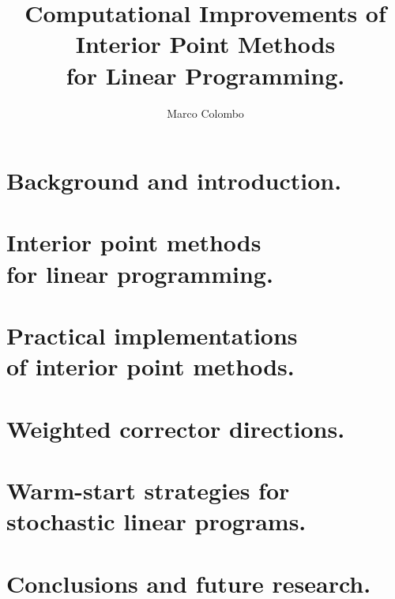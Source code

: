 \documentclass[phd,draft,leftchapter]{msthesis}
\title{Computational Improvements of \\
       Interior Point Methods \\
       for Linear Programming.}
\author{Marco Colombo}
\begin{document}
\maketitle

\dedication{For my family and my friends.\\
            Se'n foi me de chesta br\"ogna ch\'e?}
\standarddeclaration

%
%
\begin{abstract}
  
\end{abstract}

%
%
\begin{acknowledgements}
  
\end{acknowledgements}

%
%
\tableofcontents

%
%
\chapter{Background and introduction.}


\chapter[Interior point methods for linear programming.]{Interior point methods \\ for linear programming.}


\chapter[Practical implementations of interior point methods.]{Practical implementations \\ of interior point methods.}


\chapter{Weighted corrector directions.}


\chapter[Warm-start strategies for stochastic linear programs.]{Warm-start strategies for \\stochastic linear programs.}


\chapter{Conclusions and future research.}


%
%
%

%
%
%



%
%
\end{document}
